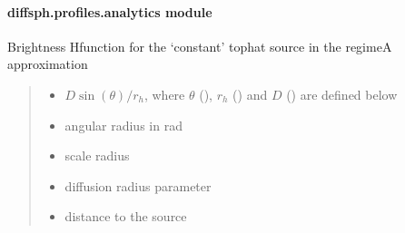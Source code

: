 \documentclass[letterpaper,10pt,english]{sphinxmanual}
\begin{document}
\paragraph{diffsph.profiles.analytics module}
\label{\detokenize{diffsph.profiles:module-diffsph.profiles.analytics}}\label{\detokenize{diffsph.profiles:diffsph-profiles-analytics-module}}

\begin{fulllineitems}
\label{\detokenize{diffsph.profiles:diffsph.profiles.analytics.cobrA}}
\pysigstartsignatures
{}
\pysigstopsignatures
\sphinxAtStartPar
Brightness H\sphinxhyphen{}function for the ‘constant’ top\sphinxhyphen{}hat source in the regime\sphinxhyphen{}A approximation
\begin{quote}\begin{description}
\begin{itemize}
\item {} 
\sphinxAtStartPar
{} \textendash{} \(D\sin(\theta)/r_h\), where \(\theta\) (), \(r_h\) () and \(D\) () are defined below

\item {} 
\sphinxAtStartPar
{} \textendash{} angular radius in rad

\item {} 
\sphinxAtStartPar
{} \textendash{} scale radius

\item {} 
\sphinxAtStartPar
{} \textendash{} diffusion radius parameter

\item {} 
\sphinxAtStartPar
{} \textendash{} distance to the source

\end{itemize}

\end{description}\end{quote}

\end{fulllineitems}
\end{document}
